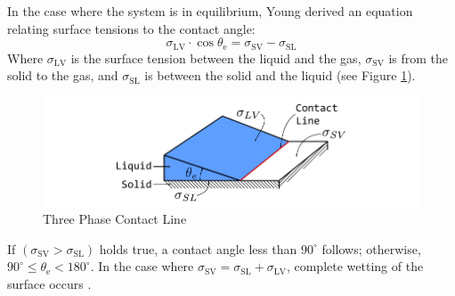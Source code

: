 In the case where the system is in equilibrium, Young \cite{youngIIIEssayCohesion1805} derived an equation relating surface tensions to the contact angle:
\begin{equation}
    \sigma_{\mathrm{LV}} \cdot \cos\theta_{\mathrm{e}} = \sigma_{\mathrm{SV}}-\sigma_{\mathrm{SL}}
    \label{eq: YoungsEQ}
\end{equation}
Where $\sigma_{\mathrm{LV}}$ is the surface tension between the liquid and the gas, $\sigma_{\mathrm{SV}}$ is from the solid to the gas, and $\sigma_{\mathrm{SL}}$ is between the solid and the liquid (see Figure \ref{fig: YoungsLaw_ThreePhaseContactLine}).
\begin{figure}[h]
    \centering
    \includegraphics[width=.9\textwidth]{Pictures/YoungsLaw.pdf}
    \caption{Three Phase Contact Line}
    \label{fig: YoungsLaw_ThreePhaseContactLine}
\end{figure}
If $(\sigma_{\mathrm{SV}}>\sigma_{\mathrm{SL}})$ holds true, a contact angle less than $90^{\circ}$ follows; otherwise, $90^{\circ}\leq \theta_{\mathrm{e}}<180^{\circ}$. In the case where $\sigma_{\mathrm{SV}}=\sigma_{\mathrm{SL}}+\sigma_{\mathrm{LV}}$, complete wetting of the surface occurs \cite{buttPhysicsChemistryInterfaces}.

